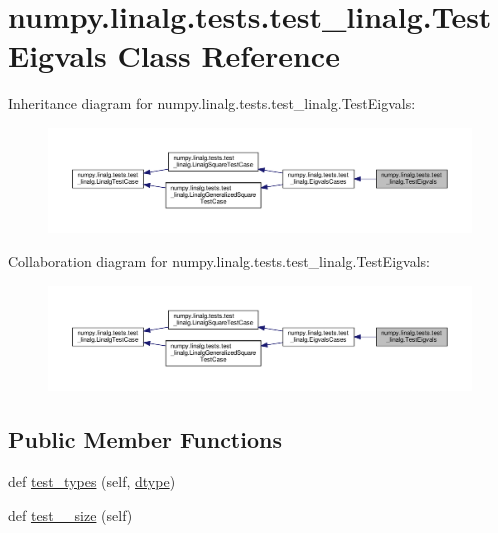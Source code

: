 \hypertarget{classnumpy_1_1linalg_1_1tests_1_1test__linalg_1_1TestEigvals}{}\section{numpy.\+linalg.\+tests.\+test\+\_\+linalg.\+Test\+Eigvals Class Reference}
\label{classnumpy_1_1linalg_1_1tests_1_1test__linalg_1_1TestEigvals}


Inheritance diagram for numpy.\+linalg.\+tests.\+test\+\_\+linalg.\+Test\+Eigvals\+:
\nopagebreak
\begin{figure}[H]
\begin{center}
\leavevmode
\includegraphics[width=350pt]{classnumpy_1_1linalg_1_1tests_1_1test__linalg_1_1TestEigvals__inherit__graph}
\end{center}
\end{figure}


Collaboration diagram for numpy.\+linalg.\+tests.\+test\+\_\+linalg.\+Test\+Eigvals\+:
\nopagebreak
\begin{figure}[H]
\begin{center}
\leavevmode
\includegraphics[width=350pt]{classnumpy_1_1linalg_1_1tests_1_1test__linalg_1_1TestEigvals__coll__graph}
\end{center}
\end{figure}
\subsection*{Public Member Functions}
\begin{DoxyCompactItemize}
\item 
def \hyperlink{classnumpy_1_1linalg_1_1tests_1_1test__linalg_1_1TestEigvals_aa068a17490bdfea7cdafe15e4184c94c}{test\+\_\+types} (self, \hyperlink{namespacenumpy_1_1linalg_1_1tests_1_1test__linalg_a1063ea74fa35b7244592f8a89b8a71a2}{dtype})
\item 
def \hyperlink{classnumpy_1_1linalg_1_1tests_1_1test__linalg_1_1TestEigvals_a23483d6248a03cae741023ece9a4b551}{test\+\_\+\_\+size} (self)
\end{DoxyCompactItemize}
